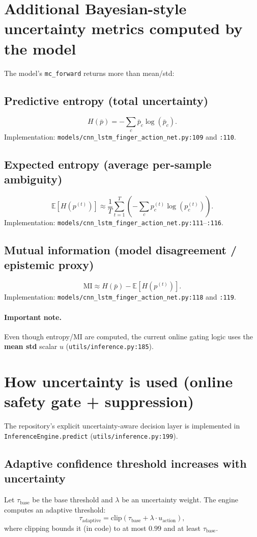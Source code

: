 \documentclass[11pt]{article}
\begin{document}
\section{Additional Bayesian-style uncertainty metrics computed by the model}

The model's \texttt{mc\_forward} returns more than mean/std:

\subsection{Predictive entropy (total uncertainty)}
\[
H(\bar{p})=-\sum_{c}\bar{p}_c\log(\bar{p}_c).
\]
Implementation: \texttt{models/cnn\_lstm\_finger\_action\_net.py:109} and \texttt{:110}.

\subsection{Expected entropy (average per-sample ambiguity)}
\[
\mathbb{E}[H(p^{(t)})]\approx \frac{1}{T}\sum_{t=1}^T\left(-\sum_c p^{(t)}_c\log(p^{(t)}_c)\right).
\]
Implementation: \texttt{models/cnn\_lstm\_finger\_action\_net.py:111}--\texttt{:116}.

\subsection{Mutual information (model disagreement / epistemic proxy)}
\[
\mathrm{MI}\approx H(\bar{p})-\mathbb{E}[H(p^{(t)})].
\]
Implementation: \texttt{models/cnn\_lstm\_finger\_action\_net.py:118} and \texttt{:119}.

\paragraph{Important note.}
Even though entropy/MI are computed, the current online gating logic uses the \textbf{mean std} scalar $u$ (\texttt{utils/inference.py:185}).

\section{How uncertainty is used (online safety gate + suppression)}

The repository's explicit uncertainty-aware decision layer is implemented in \texttt{InferenceEngine.predict} (\texttt{utils/inference.py:199}).

\subsection{Adaptive confidence threshold increases with uncertainty}
Let $\tau_{\text{base}}$ be the base threshold and $\lambda$ be an uncertainty weight.
The engine computes an adaptive threshold:
\[
\tau_{\text{adaptive}} = \mathrm{clip}\left(\tau_{\text{base}} + \lambda\cdot u_{\text{action}}\right),
\]
where clipping bounds it (in code) to at most $0.99$ and at least $\tau_{\text{base}}$.
\end{document}
